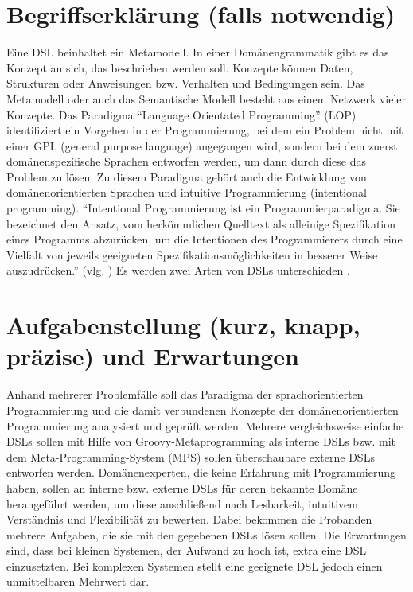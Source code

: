 \documentclass[11pt,english,ngerman, headsepline]{scrreprt}
\begin{document}
\section{Begriffserklärung (falls notwendig)}
Eine DSL beinhaltet ein Metamodell. In einer Domänengrammatik gibt es das
Konzept an sich, das beschrieben werden soll. Konzepte können Daten, Strukturen
oder Anweisungen bzw. Verhalten und Bedingungen sein. Das Metamodell oder auch
das Semantische Modell besteht aus einem Netzwerk vieler Konzepte. Das Paradigma
“Language Orientated Programming” (LOP) identifiziert ein Vorgehen in der
Programmierung, bei dem ein Problem nicht mit einer GPL (general purpose
language) angegangen wird, sondern bei dem zuerst domänenspezifische Sprachen
entworfen werden, um dann durch diese das Problem zu lösen. Zu diesem Paradigma
gehört auch die Entwicklung von domänenorientierten Sprachen und intuitive
Programmierung (intentional programming). “Intentional Programmierung ist ein
Programmierparadigma. Sie bezeichnet den Ansatz, vom herkömmlichen Quelltext als
alleinige Spezifikation eines Programms abzurücken, um die Intentionen des
Programmierers durch eine Vielfalt von jeweils geeigneten
Spezifikationsmöglichkeiten in besserer Weise auszudrücken.” (vlg.
\cite{wikiIntentional}) Es werden zwei Arten von DSLs unterschieden
\cite{fowler2010domain}. 


\section{Aufgabenstellung (kurz, knapp, präzise) und Erwartungen}

Anhand mehrerer Problemfälle soll das Paradigma der sprachorientierten
Programmierung und die damit verbundenen Konzepte der domänenorientierten
Programmierung analysiert und geprüft werden. Mehrere vergleichsweise einfache
DSLs sollen mit Hilfe von Groovy-Metaprogramming als interne DSLs bzw. mit dem
Meta-Programming-System (MPS) sollen überschaubare externe DSLs entworfen
werden. Domänenexperten, die keine Erfahrung mit Programmierung haben, sollen an
interne bzw. externe DSLs für deren bekannte Domäne herangeführt werden, um
diese anschließend nach Lesbarkeit, intuitivem Verständnis und Flexibilität zu
bewerten. Dabei bekommen die Probanden mehrere Aufgaben, die sie mit den
gegebenen DSLs lösen sollen.
Die Erwartungen sind, dass bei kleinen Systemen, der Aufwand zu hoch ist, extra
eine DSL einzusetzten. Bei komplexen Systemen stellt eine geeignete DSL jedoch
einen unmittelbaren Mehrwert dar.
\end{document}
